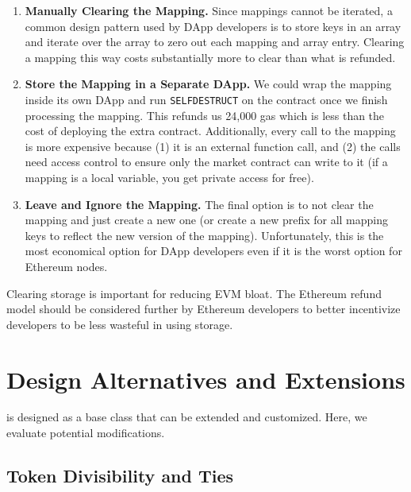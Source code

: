 \begin{enumerate}

\item \textbf{Manually Clearing the Mapping.} Since mappings cannot be iterated, a common design pattern used by DApp developers is to store keys in an array and iterate over the array to zero out each mapping and array entry. Clearing a mapping this way costs substantially more to clear than what is refunded.

\item \textbf{Store the Mapping in a Separate DApp.} We could wrap the mapping inside its own DApp and run \texttt{SELFDESTRUCT} on the contract once we finish processing the mapping. This refunds us 24,000 gas which is less than the cost of deploying the extra contract. Additionally, every call to the mapping is more expensive because (1) it is an external function call, and (2) the calls need access control to ensure only the market contract can write to it (if a mapping is a local variable, you get private access for free). 

\item \textbf{Leave and Ignore the Mapping.} The final option is to not clear the mapping and just create a new one (or create a new prefix for all mapping keys to reflect the new version of the mapping). Unfortunately, this is the most economical option for DApp developers even if it is the worst option for Ethereum nodes. 

\end{enumerate}

Clearing storage is important for reducing EVM bloat. The Ethereum refund model should be considered further by Ethereum developers to better incentivize developers to be less wasteful in using storage. 


\section{Design Alternatives and Extensions}

\cm is designed as a base class that can be extended and customized. Here, we evaluate potential modifications.

\subsection{Token Divisibility and Ties} 

